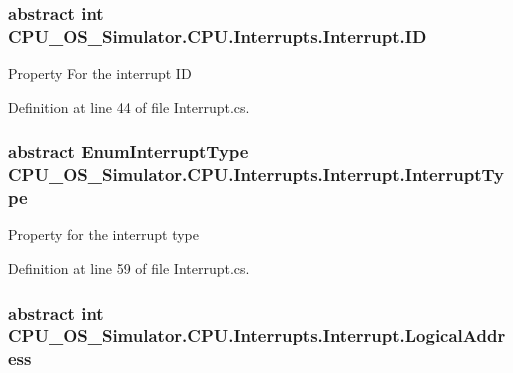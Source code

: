 \subsubsection[{I\+D}]{\setlength{\rightskip}{0pt plus 5cm}abstract int C\+P\+U\+\_\+\+O\+S\+\_\+\+Simulator.\+C\+P\+U.\+Interrupts.\+Interrupt.\+I\+D\hspace{0.3cm}{\ttfamily [get]}}\label{class_c_p_u___o_s___simulator_1_1_c_p_u_1_1_interrupts_1_1_interrupt_a8974e3bbe2504027b3a4f8aa64496c11}


Property For the interrupt I\+D 



Definition at line 44 of file Interrupt.\+cs.

\hypertarget{class_c_p_u___o_s___simulator_1_1_c_p_u_1_1_interrupts_1_1_interrupt_acb3df6a95e1ae7a8d389e84161288a1b}{}
\subsubsection[{Interrupt\+Type}]{\setlength{\rightskip}{0pt plus 5cm}abstract {\bf Enum\+Interrupt\+Type} C\+P\+U\+\_\+\+O\+S\+\_\+\+Simulator.\+C\+P\+U.\+Interrupts.\+Interrupt.\+Interrupt\+Type\hspace{0.3cm}{\ttfamily [get]}}\label{class_c_p_u___o_s___simulator_1_1_c_p_u_1_1_interrupts_1_1_interrupt_acb3df6a95e1ae7a8d389e84161288a1b}


Property for the interrupt type 



Definition at line 59 of file Interrupt.\+cs.

\hypertarget{class_c_p_u___o_s___simulator_1_1_c_p_u_1_1_interrupts_1_1_interrupt_a5d863371dc3db28878f8f818cdd003fc}{}
\subsubsection[{Logical\+Address}]{\setlength{\rightskip}{0pt plus 5cm}abstract int C\+P\+U\+\_\+\+O\+S\+\_\+\+Simulator.\+C\+P\+U.\+Interrupts.\+Interrupt.\+Logical\+Address\hspace{0.3cm}{\ttfamily [get]}}\label{class_c_p_u___o_s___simulator_1_1_c_p_u_1_1_interrupts_1_1_interrupt_a5d863371dc3db28878f8f818cdd003fc}


